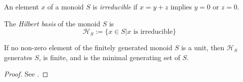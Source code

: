 \begin{definition}
  \label{0-irred}
  \uses{}
  \leanok

  An element $x$ of a monoid $S$ is \emph{irreducible} if $x = y + z$ implies $y = 0$ or $z = 0$.
\end{definition}


\begin{definition}
  \label{0-hilbert-basis}

  The \emph{Hilbert basis} of the monoid $S$ is
  \[
    \mathcal H_S := \{x \in S | x \text{ is irreducible}\}
  \]
\end{definition}


\begin{proposition}
  \label{0-hilbert-basis-finite}

  If no non-zero element of the finitely generated monoid $S$ is a unit, then $\mathcal H_S$ generates $S$, is finite, and is the minimal generating set of $S$.
\end{proposition}
\begin{proof}
  \uses{}

  See \cite{Cox_2011}.
\end{proof}
